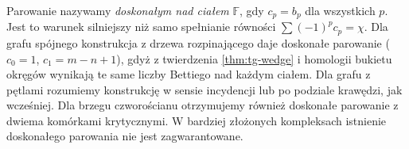 \begin{uwaga}
Parowanie nazywamy \emph{doskonałym nad ciałem}
$\mathbb F$, gdy $c_p=b_p$ dla wszystkich $p$.
Jest to warunek silniejszy niż samo spełnianie równości
$\sum(-1)^pc_p=\chi$. Dla grafu spójnego konstrukcja
z drzewa rozpinającego daje doskonałe parowanie
($c_0=1$, $c_1=m-n+1$), gdyż z twierdzenia
\ref{thm:tg-wedge} i homologii bukietu okręgów
wynikają te same liczby Bettiego nad każdym ciałem.
Dla grafu z pętlami rozumiemy konstrukcję w sensie
incydencji lub po podziale krawędzi, jak wcześniej. Dla brzegu czworościanu
otrzymujemy również doskonałe parowanie z dwiema
komórkami krytycznymi. W bardziej złożonych
kompleksach istnienie doskonałego parowania nie jest
zagwarantowane.
\end{uwaga}

